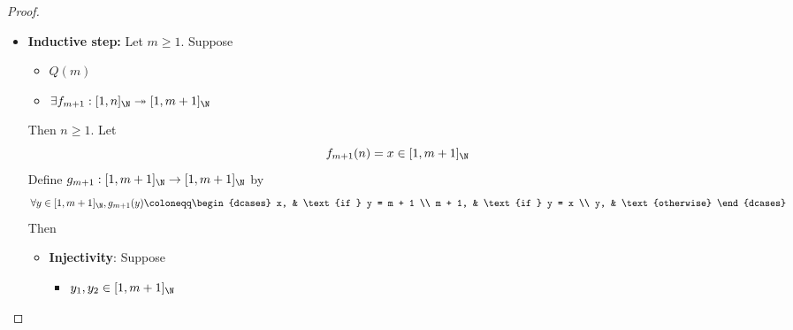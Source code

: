 \begin{proof}
\begin{enumerate}[label=\textbf{(\Alph*)}]
\begin{itemize}
\begin{itemize}
\[                            \begin{array}{c}
                              \neg(m = 0) \\
                              \Downarrow  \\
                              n \geq m \geq 1 \lor n = m = 0 \iff n \geq m \geq 1 \iff n \geq 1
                            \end{array}
                          \]
                          Then
                          \[
                            \begin{array}{c}
                              n < 1 \implies \nexists f_{m}: [1, n]_{\N} \twoheadrightarrow [1, m]_{\N} \\
                              \Downarrow                                                                \\
                              Q(1)
                            \end{array}
                          \]
                  \end{itemize}
            \item \textbf{Inductive step:} Let $m \geq 1$. Suppose
                  \begin{itemize}
                    \item $Q(m)$
                    \item $\exists f_{m + 1}: [1, n]_{\N} \twoheadrightarrow [1, m + 1]_{\N}$
                  \end{itemize}
                  Then $n \geq 1$. Let
                  \[
                    f_{m + 1}(n) = x \in [1, m + 1]_{\N}
                  \]
                  Define $g_{m + 1}: [1, m + 1]_{\N} \to [1, m + 1]_{\N}$ by
                  \[
                    \forall y \in [1, m + 1]_{\N}, g_{m + 1}(y) \coloneqq \begin{dcases}
                      x,     & \text{if } y = m + 1 \\
                      m + 1, & \text{if } y = x     \\
                      y,     & \text{otherwise}
                    \end{dcases}
                  \]
                  Then
                  \begin{itemize}
                    \item \textbf{Injectivity}: Suppose
                          \begin{itemize}
                            \item $y_{1}, y_{2} \in [1, m + 1]_{\N}$

\end{itemize}
\end{itemize}
\end{itemize}
\end{enumerate}
\end{proof}
